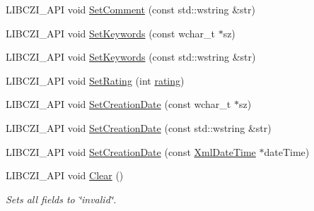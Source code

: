 \begin{DoxyCompactItemize}
\item 
L\+I\+B\+C\+Z\+I\+\_\+\+A\+PI void \hyperlink{structlib_c_z_i_1_1_general_document_info_ae07b44217a9b785e6f4a50be963cf1b3}{Set\+Comment} (const std\+::wstring \&str)
\item 
L\+I\+B\+C\+Z\+I\+\_\+\+A\+PI void \hyperlink{structlib_c_z_i_1_1_general_document_info_a1ab8bf3071f47e2275d29853f49ce472}{Set\+Keywords} (const wchar\+\_\+t $\ast$sz)
\item 
L\+I\+B\+C\+Z\+I\+\_\+\+A\+PI void \hyperlink{structlib_c_z_i_1_1_general_document_info_ad6a141a904769ed7abec8fffd71ee7b0}{Set\+Keywords} (const std\+::wstring \&str)
\item 
L\+I\+B\+C\+Z\+I\+\_\+\+A\+PI void \hyperlink{structlib_c_z_i_1_1_general_document_info_a892af777dee6758526e13c6e9aff6795}{Set\+Rating} (int \hyperlink{structlib_c_z_i_1_1_general_document_info_a26ded0bae7ffb1bc68fef7f1862c0508}{rating})
\item 
L\+I\+B\+C\+Z\+I\+\_\+\+A\+PI void \hyperlink{structlib_c_z_i_1_1_general_document_info_a6b51c358c9bc5613ae4b7d5177c643fc}{Set\+Creation\+Date} (const wchar\+\_\+t $\ast$sz)
\item 
L\+I\+B\+C\+Z\+I\+\_\+\+A\+PI void \hyperlink{structlib_c_z_i_1_1_general_document_info_a2d87d1b828fdd78abdd9562e64424bf8}{Set\+Creation\+Date} (const std\+::wstring \&str)
\item 
L\+I\+B\+C\+Z\+I\+\_\+\+A\+PI void \hyperlink{structlib_c_z_i_1_1_general_document_info_ab10e54ae223b68b4c4fe3c2b41333d2b}{Set\+Creation\+Date} (const \hyperlink{structlib_c_z_i_1_1_xml_date_time}{Xml\+Date\+Time} $\ast$date\+Time)
\item 
\mbox{\label{structlib_c_z_i_1_1_general_document_info_a99b42e36de8a12b121efe99bace8796c}} 
L\+I\+B\+C\+Z\+I\+\_\+\+A\+PI void \hyperlink{structlib_c_z_i_1_1_general_document_info_a99b42e36de8a12b121efe99bace8796c}{Clear} ()
\begin{DoxyCompactList}\small\item\em Sets all fields to \char`\"{}invalid\char`\"{}. \end{DoxyCompactList}\end{DoxyCompactItemize}
